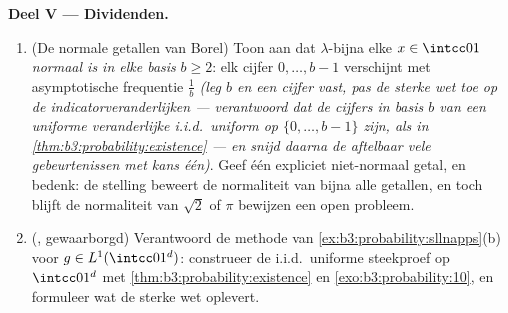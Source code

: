 \begin{problem}
\medskip
\noindent\textbf{Deel V --- Dividenden.}
\begin{enumerate}[resume]
  \item (De normale getallen van Borel) Toon aan dat
        $\lambda$-bijna elke $x \in \intcc01$ \emph{normaal is in
        elke basis} $b \geq 2$: elk cijfer $0, \dots, b-1$
        verschijnt met asymptotische frequentie $\frac1b$
        \emph{(leg $b$ en een cijfer vast, pas de sterke wet toe
        op de indicatorveranderlijken --- verantwoord dat de
        cijfers in basis $b$ van een uniforme veranderlijke
        i.i.d.\ uniform op $\{0,\dots,b-1\}$ zijn, als in
        \cref{thm:b3:probability:existence} --- en snijd daarna
        de aftelbaar vele gebeurtenissen met kans één)}. Geef één
        expliciet niet-normaal getal, en bedenk: de stelling
        beweert de normaliteit van bijna alle getallen, en toch
        blijft de normaliteit van $\sqrt2$ of $\pi$ bewijzen een
        open probleem.
  \item (, gewaarborgd) Verantwoord de methode van
        \cref{ex:b3:probability:sllnapps}(b)  voor $g \in
        L^1(\intcc01^d)$: construeer de i.i.d.\ uniforme
        steekproef op $\intcc01^d$ met
        \cref{thm:b3:probability:existence} en
        \cref{exo:b3:probability:10}, en formuleer wat de sterke
        wet oplevert.
\end{enumerate}


\end{problem}
